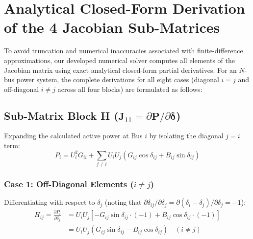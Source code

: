 \documentclass[12pt,a4paper,oneside]{report}
\begin{document}
\section{Analytical Closed-Form Derivation of the 4 Jacobian Sub-Matrices}
To avoid truncation and numerical inaccuracies associated with finite-difference approximations, our developed numerical solver computes all elements of the Jacobian matrix using exact analytical closed-form partial derivatives. For an $N$-bus power system, the complete derivations for all eight cases (diagonal $i=j$ and off-diagonal $i \neq j$ across all four blocks) are formulated as follows:

\subsection{Sub-Matrix Block H ($\mathbf{J}_{11} = \partial \mathbf{P} / \partial \boldsymbol{\delta}$)}
Expanding the calculated active power at Bus $i$ by isolating the diagonal $j = i$ term:
\begin{equation}
P_i = U_i^2 G_{ii} + \sum_{j \neq i} U_i U_j (G_{ij} \cos\delta_{ij} + B_{ij} \sin\delta_{ij})
\end{equation}

\subsubsection{Case 1: Off-Diagonal Elements ($i \neq j$)}
Differentiating with respect to $\delta_j$ (noting that $\partial \delta_{ij} / \partial \delta_j = \partial(\delta_i - \delta_j)/\partial \delta_j = -1$):
\begin{align}
H_{ij} = \frac{\partial P_i}{\partial \delta_j} &= U_i U_j \left[ -G_{ij} \sin\delta_{ij} \cdot (-1) + B_{ij} \cos\delta_{ij} \cdot (-1) \right] \nonumber \\
&= U_i U_j (G_{ij} \sin\delta_{ij} - B_{ij} \cos\delta_{ij}) \quad (i \neq j)
\end{align}
\end{document}
